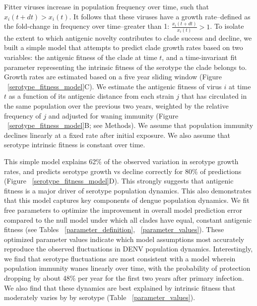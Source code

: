 \documentclass[11pt,oneside,letterpaper]{article}
\begin{document}
Fitter viruses increase in population frequency over time, such that $x_i(t+dt) > x_i(t)$.
It follows that these viruses have a growth rate--defined as the fold-change in frequency over time--greater than 1: $\frac{x_i(t+dt)}{x_i(t)} > 1$.
To isolate the extent to which antigenic novelty contributes to clade success and decline, we built a simple model that attempts to predict clade growth rates based on two variables: the antigenic fitness of the clade at time $t$, and a time-invariant fit parameter representing the intrinsic fitness of the serotype the clade belongs to.
Growth rates are estimated based on a five year sliding window (Figure ~\ref{serotype_fitness_model}C).
We estimate the antigenic fitness of virus $i$ at time $t$ as a function of its antigenic distance from each strain $j$ that has circulated in the same population over the previous two years, weighted by the relative frequency of $j$ and adjusted for waning immunity (Figure ~\ref{serotype_fitness_model}B; see Methods).
We assume that population immunity declines linearly at a fixed rate after initial exposure.
We also assume that serotype intrinsic fitness is constant over time.

This simple model explains 62\% of the observed variation in serotype growth rates, and predicts serotype growth vs decline correctly for 80\% of predictions (Figure ~\ref{serotype_fitness_model}D).
This strongly suggests that antigenic fitness is a major driver of serotype population dynamics.
This also demonstrates that this model captures key components of dengue population dynamics.
We fit free parameters to optimize the improvement in overall model prediction error compared to the null model under which all clades have equal, constant antigenic fitness (see Tables ~\ref{parameter_definition}, ~\ref{parameter_values}).
These optimized parameter values indicate which model assumptions most accurately reproduce the observed fluctuations in DENV population dynamics.
Interestingly, we find that serotype fluctuations are most consistent with a model wherein population immunity wanes linearly over time, with the probability of protection dropping by about 48\% per year for the first two years after primary infection.
We also find that these dynamics are best explained by intrinsic fitness that moderately varies by by serotype (Table ~\ref{parameter_values}).
\end{document}
